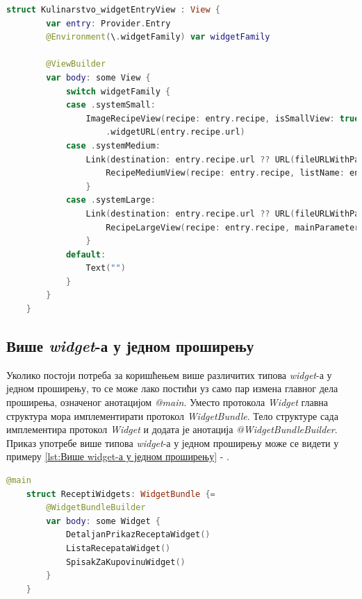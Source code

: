 \documentclass[12pt,oneside]{memoir}
\begin{document}
\begin{lstlisting}[caption=\textit{{Везе унутар widget-а}}, label={lst:Везе унутар widget-а}, language=Swift, frame=single]
    struct Kulinarstvo_widgetEntryView : View {
        var entry: Provider.Entry
        @Environment(\.widgetFamily) var widgetFamily
        
        @ViewBuilder
        var body: some View {
            switch widgetFamily {
            case .systemSmall:
                ImageRecipeView(recipe: entry.recipe, isSmallView: true)
                    .widgetURL(entry.recipe.url)
            case .systemMedium:
                Link(destination: entry.recipe.url ?? URL(fileURLWithPath: "")) {
                    RecipeMediumView(recipe: entry.recipe, listName: entry.parameterToShow)
                }
            case .systemLarge:
                Link(destination: entry.recipe.url ?? URL(fileURLWithPath: "")) {
                    RecipeLargeView(recipe: entry.recipe, mainParameter: entry.parameterToShow)
                }
            default:
                Text("")
            }
        }
    }
\end{lstlisting}

\subsection{Више \textit{widget}-а у једном проширењу}
\indent Уколико постоји потреба за коришћењем више различитих типова \textit{widget}-а у једном проширењу, то се може лако постићи уз само пар измена главног дела проширења, означеног анотацијом \textit{@main}. Уместо протокола \textit{Widget} главна структура мора имплементирати протокол \textit{WidgetBundle}. Тело структуре сада имплементира протокол \textit{Widget} и додата је анотација \textit{@WidgetBundleBuilder}. Приказ употребе више типова \textit{widget}-а у једном проширењу може се видети у примеру \ref{lst:Више widget-а у једном проширењу} - .

\begin{lstlisting}[caption=\textit{{Више widget-а у једном проширењу}}, label={lst:Више widget-а у једном проширењу}, language=Swift, frame=single]
    @main
    struct ReceptiWidgets: WidgetBundle {=
        @WidgetBundleBuilder
        var body: some Widget {
            DetaljanPrikazReceptaWidget()
            ListaRecepataWidget()
            SpisakZaKupovinuWidget()
        }
    }
\end{lstlisting}
\end{document}

